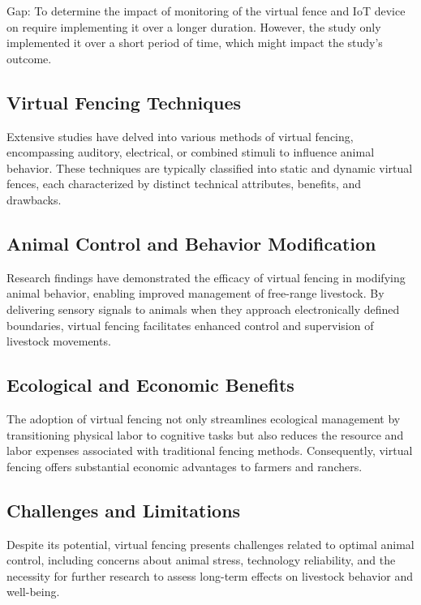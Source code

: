 \documentclass[conference]{main}
\begin{document}
Gap:
To determine the impact of monitoring of the virtual fence and IoT device on require implementing it over a longer duration. However, the study only implemented it over a short period of time, which might impact the study's outcome.



\subsection{Virtual Fencing Techniques}

Extensive studies have delved into various methods of virtual fencing,
encompassing auditory, electrical, or combined stimuli to influence animal
behavior. These techniques are typically classified into static and dynamic
virtual fences, each characterized by distinct technical attributes, benefits,
and drawbacks.

\subsection{Animal Control and Behavior Modification}

Research findings have demonstrated the efficacy of virtual fencing in modifying
animal behavior, enabling improved management of free-range livestock. By
delivering sensory signals to animals when they approach electronically defined
boundaries, virtual fencing facilitates enhanced control and supervision of
livestock movements.

\subsection{Ecological and Economic Benefits}

The adoption of virtual fencing not only streamlines ecological management by
transitioning physical labor to cognitive tasks but also reduces the resource
and labor expenses associated with traditional fencing methods. Consequently,
virtual fencing offers substantial economic advantages to farmers and ranchers.

\subsection{Challenges and Limitations}

Despite its potential, virtual fencing presents challenges related to optimal
animal control, including concerns about animal stress, technology reliability,
and the necessity for further research to assess long-term effects on livestock
behavior and well-being.
\end{document}
